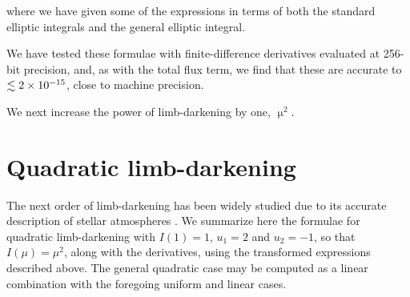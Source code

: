 \documentclass[modern]{aastex61}
\begin{document}
where we have given some of the expressions in terms of both the standard elliptic integrals
and the general elliptic integral.


We have tested these formulae with finite-difference derivatives evaluated at
256-bit precision, and, as with the total flux term, we find that these are accurate
to $\lesssim 2 \times 10^{-15}$, close to machine precision.

We next increase the power of limb-darkening by one, $\upmu^2$.

\section{Quadratic limb-darkening}\label{sec:quadratic}

The next order of limb-darkening has been widely studied due to its
accurate description of stellar atmospheres \citep{Claret2000,MandelAgol2002,Pal2008}.
We summarize here the formulae for quadratic limb-darkening with $I(1)=1$, $u_1=2$ and
$u_2=-1$, so that $I(\mu)=\mu^2$, along with the derivatives, using the transformed 
expressions described above.  The general quadratic case may be computed as
a linear combination with the foregoing uniform and linear cases.
\end{document}
